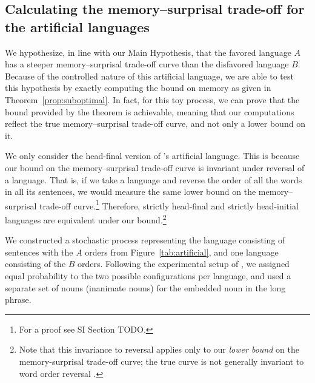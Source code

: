 \subsection{Calculating the memory--surprisal trade-off for the artificial languages}

We hypothesize, in line with our Main Hypothesis, that the favored language $A$ has a steeper memory--surprisal trade-off curve than the disfavored language $B$. Because of the controlled nature of this artificial language, we are able to test this hypothesis by exactly computing the bound on memory as given in Theorem~\ref{prop:suboptimal}. In fact, for this toy process, we can prove that the bound provided by the theorem is achievable, meaning that our computations reflect the true memory--surprisal trade-off curve, and not only a lower bound on it.

We only consider the head-final version of \citet{fedzechkina-human-2017}'s artificial language. This is because our bound on the memory--surprisal trade-off curve is invariant under reversal of a language. That is, if we take a language and reverse the order of all the words in all its sentences, we would measure the same lower bound on the memory--surprisal trade-off curve.\footnote{For a proof see SI Section TODO.} Therefore, strictly head-final and strictly head-initial languages are equivalent under our bound.\footnote{Note that this invariance to reversal applies only to our \emph{lower bound} on the memory-surprisal trade-off curve; the true curve is not generally invariant to word order reversal \citep{crutchfield-times-2009}.} 


We constructed a stochastic process representing the language consisting of sentences with the $A$ orders from Figure~\ref{tab:artificial}, and one language consisting of the $B$ orders. Following the experimental setup of \cite{fedzechkina-human-2017}, we assigned equal probability to the two possible configurations per language, and used a separate set of nouns (inanimate nouns) for the embedded noun in the long phrase.


